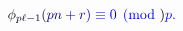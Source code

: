 \documentclass[12pt]{article}
\begin{document}
\makeatletter
\renewcommand*{\@textcolor}[3]{%
  \protect\leavevmode
  \begingroup
    \color#1{#2}#3%
  \endgroup
}
\makeatother
\begin{displaymath}
\mathcolor[RGB]{0,0,15}{\phi} _ { \mathcolor[RGB]{0,0,30}{p} \mathcolor[RGB]{0,0,45}{\ell} \mathcolor[RGB]{0,0,60}{-} \mathcolor[RGB]{0,0,75}{1} } \mathcolor[RGB]{0,0,90}{(} \mathcolor[RGB]{0,0,105}{p} \mathcolor[RGB]{0,0,120}{n} \mathcolor[RGB]{0,0,135}{+} \mathcolor[RGB]{0,0,150}{r} \mathcolor[RGB]{0,0,165}{)} \mathcolor[RGB]{0,0,180}{\equiv} \mathcolor[RGB]{0,0,195}{0} \mathcolor[RGB]{0,0,210}{\pmod} { \mathcolor[RGB]{0,0,225}{p} } \mathcolor[RGB]{0,0,240}{.}
\end{displaymath}
\end{document}
